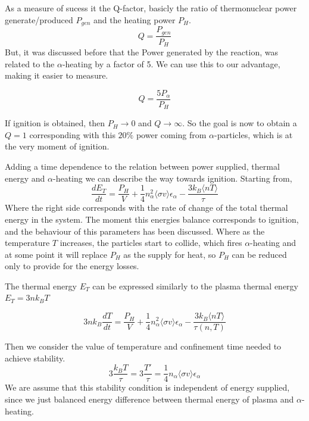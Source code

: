 \documentclass[smallextended]{svjour3}
\begin{document}
As a measure of sucess it the Q-factor, basicly the ratio of thermonuclear power generate/produced $P_{gen}$ and the heating power $P_H$.
\begin{equation}
    Q = \frac{P_{gen}}{P_{H}}
\end{equation}
But, it was discussed before that the Power generated by the reaction, was related to the $\alpha$-heating by a factor of 5. We can use this to our advantage, making it easier to measure.

\begin{equation}
    Q = \frac{5P_{\alpha}}{P_{H}}
\end{equation}

If ignition is obtained, then $P_H \to 0$ and $Q\to \infty$. So the goal is now to obtain a $Q=1$ corresponding with this $20\%$ power coming from $\alpha$-particles, which is at the very moment of ignition. 

Adding a time dependence to the relation between power supplied, thermal energy and $\alpha$-heating we can describe the way towards ignition.
Starting from,
\begin{equation}
     \frac{dE_{T}}{dt} = \frac{P_{H}}{V} + \frac{1}{4} n_{\alpha}^2  \langle \sigma v\rangle \epsilon_{\alpha} - \frac{3k_B \langle n T \rangle}{\tau}
\end{equation}
Where the right side corresponds with the rate of change of the total thermal energy in the system. The moment this energies balance corresponds to ignition, and the behaviour of this parameters has been discussed. Where as the temperature $T$ increases, the particles start to collide, which fires $\alpha$-heating and at some point it will replace $P_H$ as the supply for heat, so $P_H$ can be reduced only to provide for the energy losses.

The thermal energy $E_T$ can be expressed similarly to the plasma thermal energy $E_T = 3nk_BT$

\begin{equation}
    3nk_B \frac{dT}{dt} = \frac{P_{H}}{V} + \frac{1}{4} n_{\alpha}^2  \langle \sigma v\rangle \epsilon_{\alpha} - \frac{3k_B \langle n T \rangle}{\tau(n,T)}
\end{equation}

Then we consider the value of temperature and confinement time needed to achieve stability.
\begin{equation}
    3\frac{k_BT}{\tau} = 3\frac{T'}{\tau} = \frac{1}{4} n_{\alpha}  \langle \sigma v\rangle \epsilon_{\alpha}
    \label{weakeq}
\end{equation}
We are assume that this stability condition is independent of energy supplied, since we just balanced energy difference between thermal energy of plasma and $\alpha$-heating.
\end{document}
